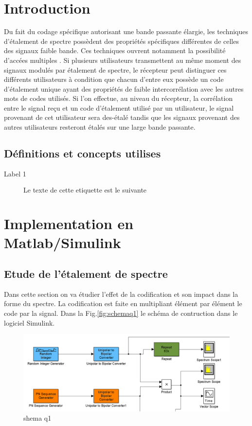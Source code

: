 \documentclass{report}
\begin{document}
\chapter{Introduction}%
Du fait du codage spécifique autorisant une bande passante élargie, les techniques d’étalement
de spectre possèdent des propriétés spécifiques différentes de celles des signaux faible bande.
Ces techniques ouvrent notamment la possibilité d’accées multiples . Si plusieurs utilisateurs
transmettent au même moment des signaux modulés par étalement de spectre, le récepteur
peut distinguer ces différents utilisateurs à condition que chacun d’entre eux possède un code
d’étalement unique ayant des propriétés de faible intercorrélation avec les autres mots de
codes utilisés.
Si l’on effectue, au niveau du récepteur, la corrélation entre le signal reçu et un code
d’étalement utilisé par un utilisateur, le signal provenant de cet utilisateur sera des-étalé tandis
que les signaux provenant des autres utilisateurs resteront étalés sur une large bande
passante.

\section{Définitions et concepts utilises}%
\begin{description}
	\item  [Label 1] Le texte de cette etiquette est le suivante
\end{description}

\chapter{Implementation en Matlab/Simulink}%
\section{Etude de l'étalement de spectre}%
Dans cette section on va étudier l'effet de la codification et son impact dans la forme du spectre.
La codification est faite en multipliant élément par élément le code par la signal. Dans la Fig.\ref{fig:schemaq1} le schéma de contruction dans le 
logiciel Simulink.
\begin{figure}[h]
	\centering
	\includegraphics[width=0.7\linewidth]{schema_q1_solo_63}
	\caption{shema q1}
	\label{fig:schemaq1_solo}
\end{figure}
\end{document}
